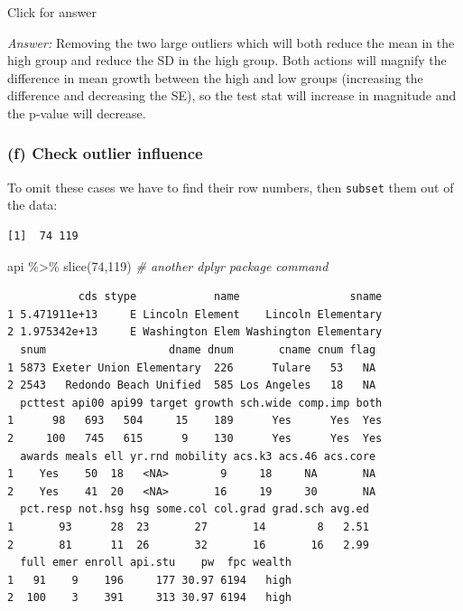 \documentclass[
]{book}
\newenvironment{Shaded}{\begin{snugshade}}{\end{snugshade}}
\newcommand{\CommentTok}[1]{\textcolor[rgb]{0.56,0.35,0.01}{\textit{#1}}}
\newcommand{\DecValTok}[1]{\textcolor[rgb]{0.00,0.00,0.81}{#1}}
\newcommand{\FunctionTok}[1]{\textcolor[rgb]{0.00,0.00,0.00}{#1}}
\newcommand{\NormalTok}[1]{#1}
\newcommand{\SpecialCharTok}[1]{\textcolor[rgb]{0.00,0.00,0.00}{#1}}
\begin{document}
Click for answer

\emph{Answer:} Removing the two large outliers which will both reduce the mean in the high group and reduce the SD in the high group. Both actions will magnify the difference in mean growth between the high and low groups (increasing the difference and decreasing the SE), so the test stat will increase in magnitude and the p-value will decrease.

\hypertarget{f-check-outlier-influence}{%
\subsubsection{(f) Check outlier influence}\label{f-check-outlier-influence}}

To omit these cases we have to find their row numbers, then \texttt{subset} them out of the data:

\begin{Shaded}
\end{Shaded}

\begin{verbatim}
[1]  74 119
\end{verbatim}

\begin{Shaded}
\begin{Highlighting}[]
\NormalTok{api }\SpecialCharTok{\%\textgreater{}\%} \FunctionTok{slice}\NormalTok{(}\DecValTok{74}\NormalTok{,}\DecValTok{119}\NormalTok{)  }\CommentTok{\# another dplyr package command}
\end{Highlighting}
\end{Shaded}

\begin{verbatim}
           cds stype            name                 sname
1 5.471911e+13     E Lincoln Element    Lincoln Elementary
2 1.975342e+13     E Washington Elem Washington Elementary
  snum                   dname dnum       cname cnum flag
1 5873 Exeter Union Elementary  226      Tulare   53   NA
2 2543   Redondo Beach Unified  585 Los Angeles   18   NA
  pcttest api00 api99 target growth sch.wide comp.imp both
1      98   693   504     15    189      Yes      Yes  Yes
2     100   745   615      9    130      Yes      Yes  Yes
  awards meals ell yr.rnd mobility acs.k3 acs.46 acs.core
1    Yes    50  18   <NA>        9     18     NA       NA
2    Yes    41  20   <NA>       16     19     30       NA
  pct.resp not.hsg hsg some.col col.grad grad.sch avg.ed
1       93      28  23       27       14        8   2.51
2       81      11  26       32       16       16   2.99
  full emer enroll api.stu    pw  fpc wealth
1   91    9    196     177 30.97 6194   high
2  100    3    391     313 30.97 6194   high
\end{verbatim}
\end{document}

